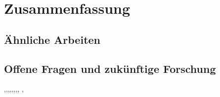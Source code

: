 \chapter{Zusammenfassung}

\section{Ähnliche Arbeiten}

\section{Offene Fragen und zukünftige Forschung}
\cite{res},\cite{n-3},\cite{OnDet},\cite{Bounds},\cite{Discrep},\cite{Cartesian},\cite{upper},\cite{landmarks}, \cite{Erdos}, \cite{botmapdoag}

\pagebreak


